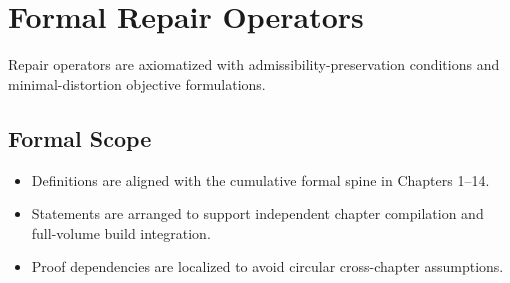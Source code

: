\documentclass[../../clio.tex]{subfiles}
\begin{document}
\chapter{Formal Repair Operators}
\label{apx:h-repair-operators}

Repair operators are axiomatized with admissibility-preservation conditions and minimal-distortion objective formulations.

\section{Formal Scope}
\begin{itemize}
  \item Definitions are aligned with the cumulative formal spine in Chapters 1--14.
  \item Statements are arranged to support independent chapter compilation and full-volume build integration.
  \item Proof dependencies are localized to avoid circular cross-chapter assumptions.
\end{itemize}
\end{document}
